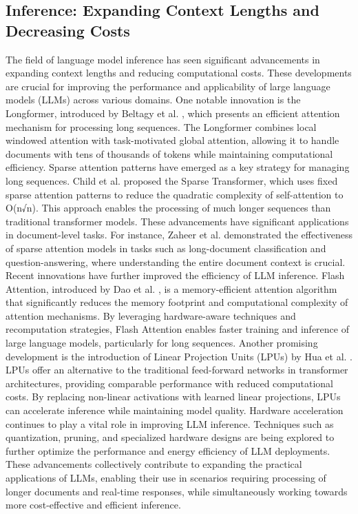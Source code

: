 \documentclass[a4paper, oneside]{discothesis}
\begin{document}
\subsection{Inference: Expanding Context Lengths and Decreasing Costs}
The field of language model inference has seen significant advancements in expanding context lengths and reducing computational costs. These developments are crucial for improving the performance and applicability of large language models (LLMs) across various domains.
One notable innovation is the Longformer, introduced by Beltagy et al. \cite{beltagy2020longformer}, which presents an efficient attention mechanism for processing long sequences. The Longformer combines local windowed attention with task-motivated global attention, allowing it to handle documents with tens of thousands of tokens while maintaining computational efficiency.
Sparse attention patterns have emerged as a key strategy for managing long sequences. Child et al. \cite{child2019generating} proposed the Sparse Transformer, which uses fixed sparse attention patterns to reduce the quadratic complexity of self-attention to O(n√n). This approach enables the processing of much longer sequences than traditional transformer models.
These advancements have significant applications in document-level tasks. For instance, Zaheer et al. \cite{zaheer2020big} demonstrated the effectiveness of sparse attention models in tasks such as long-document classification and question-answering, where understanding the entire document context is crucial.
Recent innovations have further improved the efficiency of LLM inference. Flash Attention, introduced by Dao et al. \cite{dao2022flashattention}, is a memory-efficient attention algorithm that significantly reduces the memory footprint and computational complexity of attention mechanisms. By leveraging hardware-aware techniques and recomputation strategies, Flash Attention enables faster training and inference of large language models, particularly for long sequences.
Another promising development is the introduction of Linear Projection Units (LPUs) by Hua et al. \cite{hua2022transformer}. LPUs offer an alternative to the traditional feed-forward networks in transformer architectures, providing comparable performance with reduced computational costs. By replacing non-linear activations with learned linear projections, LPUs can accelerate inference while maintaining model quality.
Hardware acceleration continues to play a vital role in improving LLM inference. Techniques such as quantization, pruning, and specialized hardware designs are being explored to further optimize the performance and energy efficiency of LLM deployments.
These advancements collectively contribute to expanding the practical applications of LLMs, enabling their use in scenarios requiring processing of longer documents and real-time responses, while simultaneously working towards more cost-effective and efficient inference.
\end{document}

